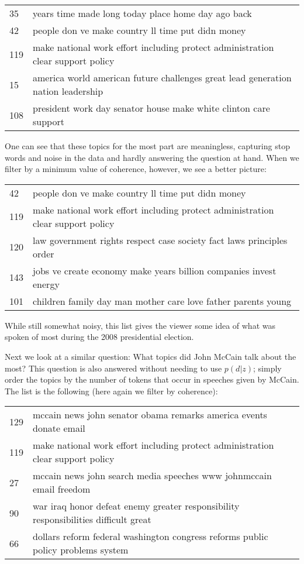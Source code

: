 \documentclass{article}
\begin{document}
\begin{tabular}{l|l}
  35 & years time made long today place home day ago back \\
  42 & people don ve make country ll time put didn money \\
  119 & make national work effort including protect administration clear
	support policy \\
  15 & america world american future challenges great lead generation nation
	leadership \\
  108 & president work day senator house make white clinton care support \\
\end{tabular}

One can see that these topics for the most part are meaningless, capturing stop
words and noise in the data and hardly answering the question at hand.  When we
filter by a minimum value of coherence, however, we see a better picture:

\begin{tabular}{l|l}
  42 & people don ve make country ll time put didn money \\
  119 & make national work effort including protect administration clear
	support policy \\
  120 & law government rights respect case society fact laws principles order \\
  143 & jobs ve create economy make years billion companies invest energy \\
  101 & children family day man mother care love father parents young \\
\end{tabular}

While still somewhat noisy, this list gives the viewer some idea of what was
spoken of most during the 2008 presidential election.

Next we look at a similar question: What topics did John McCain talk about the
most?  This question is also answered without needing to use $p(d|z)$; simply
order the topics by the number of tokens that occur in speeches given by
McCain.  The list is the following (here again we filter by coherence):

\begin{tabular}{l|l}
  129 & mccain news john senator obama remarks america events donate email \\
  119 & make national work effort including protect administration clear
	support policy \\
  27 & mccain news john search media speeches www johnmccain email freedom \\
  90 & war iraq honor defeat enemy greater responsibility responsibilities
	difficult great \\
  66 & dollars reform federal washington congress reforms public policy
	problems system \\
\end{tabular}
\end{document}
